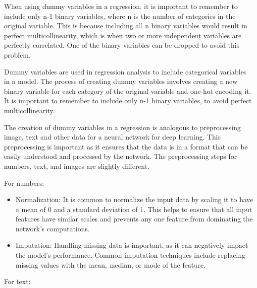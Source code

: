 When using dummy variables in a regression, it is important to remember to include only n-1 binary variables, where n is the number of categories in the original variable. This is because including all n binary variables would result in perfect multicollinearity, which is when two or more independent variables are perfectly correlated. One of the binary variables can be dropped to avoid this problem.

Dummy variables are used in regression analysis to include categorical variables in a model. The process of creating dummy variables involves creating a new binary variable for each category of the original variable and one-hot encoding it. It is important to remember to include only n-1 binary variables, to avoid perfect multicollinearity.

The creation of dummy variables in a regression is analogous to preprocessing image, text and other data for a neural network for deep learning. This preprocessing is important  as it ensures that the data is in a format that can be easily understood and processed by the network. The preprocessing steps for numbers, text, and images are slightly different.

For numbers:
\begin{itemize}
	\item Normalization: It is common to normalize the input data by scaling it to have a mean of 0 and a standard deviation of 1. This helps to ensure that all input features have similar scales and prevents any one feature from dominating the network's computations.
	\item Imputation: Handling missing data is important, as it can negatively impact the model's performance. Common imputation techniques include replacing missing values with the mean, median, or mode of the feature.
\end{itemize}

For text:

